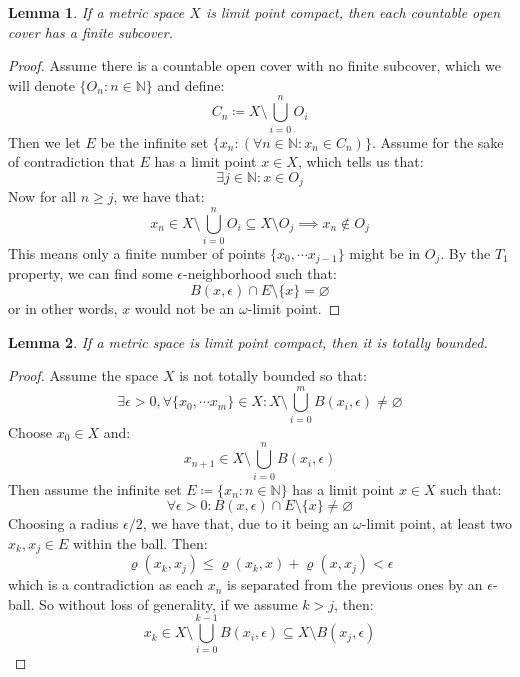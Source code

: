 \documentclass[10pt,letterpaper]{article} %
\newtheorem{lem}{Lemma}[section]
\begin{document}
\begin{lem}
If a metric space $X$ is limit point compact, then each countable open cover has a finite subcover.
\end{lem}
\begin{proof}
Assume there is a countable open cover with no finite subcover, which we will denote $\{O_n : n \in \mathbb{N}\}$ and define:
\begin{equation*}
C_n \coloneq X \setminus \bigcup_{i=0}^nO_i
\end{equation*}
Then we let $E$ be the infinite set $\{x_n : (\forall n \in \mathbb{N}: x_n \in C_n)\}$. Assume for the sake of contradiction that $E$ has a limit point $x \in X$, which tells us that:
\begin{equation*}
\exists j \in \mathbb{N}: x \in O_j
\end{equation*}
Now for all $n \geqslant j$, we have that:
\begin{equation*}
x_n \in X \setminus \bigcup_{i= 0}^n O_i \subseteq X \setminus O_j \implies x_n \notin O_j
\end{equation*}
This means only a finite number of points $\{x_0, \cdots x_{j-1}\}$ might be in $O_j$. By the $T_1$ property, we can find some $\epsilon$-neighborhood such that:
\begin{equation*}
B(x, \epsilon) \cap E \setminus \{x\} = \varnothing
\end{equation*}
or in other words, $x$ would not be an $\omega$-limit point.
\end{proof}

\begin{lem}
If a metric space is limit point compact, then it is totally bounded.
\end{lem}
\begin{proof}
Assume the space $X$ is not totally bounded so that:
\begin{equation*}
\exists \epsilon > 0, \forall \{x_0, \cdots x_m\} \in X: X \setminus \bigcup_{i=0}^m B(x_i, \epsilon) \neq \varnothing
\end{equation*}
Choose $x_0 \in X$ and:
\begin{equation*}
x_{n+1} \in X \setminus \bigcup_{i=0}^n B(x_i, \epsilon)
\end{equation*}
Then assume the infinite set $E \coloneq \{x_n : n \in \mathbb{N}\}$ has a limit point $x \in X$ such that:
\begin{equation*}
\forall \epsilon > 0: B(x, \epsilon) \cap E \setminus \{x\} \neq \varnothing
\end{equation*}
Choosing a radius $\epsilon/2$, we have that, due to it being an $\omega$-limit point, at least two $x_k, x_j \in E$ within the ball. Then:
\begin{equation*}
\varrho(x_k, x_j) \leqslant \varrho(x_k, x) + \varrho(x, x_j) < \epsilon
\end{equation*}
which is a contradiction as each $x_n$ is separated from the previous ones by an $\epsilon$-ball. So without loss of generality, if we assume $k > j$, then:
\begin{equation*}
x_k \in X \setminus \bigcup_{i=0}^{k-1}B(x_i, \epsilon) \subseteq X \setminus B(x_j, \epsilon)
\end{equation*}
\end{proof}
\end{document}
